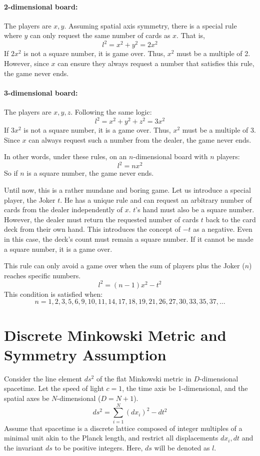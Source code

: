 \documentclass[11pt,a4paper]{article}
\begin{document}
\paragraph{2-dimensional board:}
The players are \( x, y \). Assuming spatial axis symmetry, there is a special rule where \( y \) can only request the same number of cards as \( x \). That is,
\[ l^2 = x^2 + y^2 = 2x^2 \]
If \( 2x^2 \) is not a square number, it is game over. Thus, \( x^2 \) must be a multiple of 2. However, since \( x \) can ensure they always request a number that satisfies this rule, the game never ends.

\paragraph{3-dimensional board:}
The players are \( x, y, z \). Following the same logic:
\[ l^2 = x^2 + y^2 + z^2 = 3x^2 \]
If \( 3x^2 \) is not a square number, it is a game over. Thus, \( x^2 \) must be a multiple of 3. Since \( x \) can always request such a number from the dealer, the game never ends.

In other words, under these rules, on an \( n \)-dimensional board with \( n \) players:
\[ l^2 = n x^2 \]
So if \( n \) is a square number, the game never ends.

Until now, this is a rather mundane and boring game. Let us introduce a special player, the Joker \( t \). He has a unique rule and can request an arbitrary number of cards from the dealer independently of \( x \). \( t \)'s hand must also be a square number. However, the dealer must return the requested number of cards \( t \) back to the card deck from their own hand. This introduces the concept of \( -t \) as a negative. Even in this case, the deck's count must remain a square number. If it cannot be made a square number, it is a game over.

This rule can only avoid a game over when the sum of players plus the Joker (\( n \)) reaches specific numbers.
\[ l^2 = (n - 1) x^2 - t^2 \]
This condition is satisfied when:
\[ n = 1, 2, 3, 5, 6, 9, 10, 11, 14, 17, 18, 19, 21, 26, 27, 30, 33, 35, 37, \dots \]

\section{Discrete Minkowski Metric and Symmetry Assumption}
Consider the line element \( ds^2 \) of the flat Minkowski metric in \( D \)-dimensional spacetime. Let the speed of light \( c=1 \), the time axis be 1-dimensional, and the spatial axes be \( N \)-dimensional (\( D = N+1 \)).
\[ ds^2 = \sum_{i=1}^{N} (dx_i)^2 - dt^2 \]
Assume that spacetime is a discrete lattice composed of integer multiples of a minimal unit akin to the Planck length, and restrict all displacements \( dx_i, dt \) and the invariant \( ds \) to be positive integers. Here, \( ds \) will be denoted as \( l \).
\end{document}
